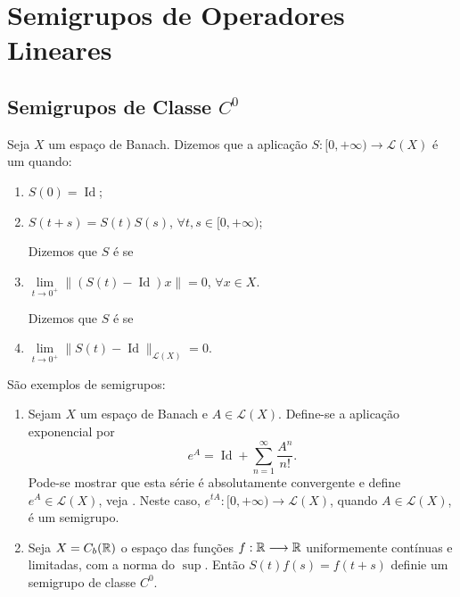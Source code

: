 \chapter{Semigrupos de Operadores Lineares}

\section{Semigrupos de Classe $C^0$}



\begin{definition}
     Seja $X$ um espaço de Banach. Dizemos que a aplicação $S:[0,+\infty)\longrightarrow \mathcal{L}(X)$ é um   quando:
\begin{enumerate}
    \item $S(0)=\operatorname{Id}$;
    \item $S(t+s)=S(t)S(s)$, $\forall t,s\in [0,+\infty)$;

Dizemos que $S$ é  se

    \item $\lim\limits_{t\to0^+} \|(S(t)-\operatorname{Id})x\|=0$, $\forall x\in X$.

Dizemos que $S$ é  se 

\item $\lim\limits_{t\to 0^+}\|S(t)-\operatorname{Id}\|_{\mathcal{L}(X)}=0$.
\end{enumerate}
\end{definition}

   \begin{example} São exemplos de semigrupos:
        \begin{enumerate}
            \item Sejam $X$ um espaço de Banach e  $A\in \mathcal{L}(X)$. Define-se a aplicação exponencial por
            \[e^{A}=\operatorname{Id}+\sum_{n=1}^\infty \frac{A^n}{n!}.\]
            Pode-se mostrar que esta série é absolutamente convergente e define $e^{A}\in \mathcal{L}(X)$, veja \cite[Apêndice 2]{gomes1985semigrupos}. Neste caso,  $e^{tA}:[0,+\infty)\to \mathcal{L}(X)$, quando $A\in \mathcal{L}(X)$, é um semigrupo.
            \item Seja $X=C_b(\mathbb{R})$  o espaço das funções $f:\mathbb{R}\longrightarrow \mathbb{R}$ uniformemente contínuas e limitadas, com a norma do $\sup$. Então $S(t)f(s)=f(t+s)$ definie um semigrupo de classe $C^0$.
        \end{enumerate}
    \end{example}


